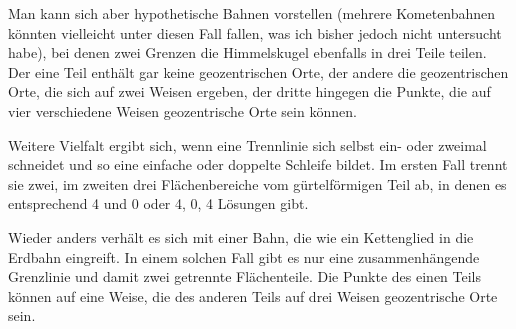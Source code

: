 Man kann sich aber hypothetische Bahnen vorstellen\HistoricalNoteDouble{Siehe Notiz 18.]} (mehrere Kometenbahnen könnten vielleicht unter diesen Fall fallen, was ich bisher jedoch nicht untersucht habe), bei denen zwei Grenzen die Himmelskugel ebenfalls in drei Teile teilen. Der eine Teil enthält gar keine geozentrischen Orte, der andere die geozentrischen Orte, die sich auf zwei Weisen ergeben, der dritte hingegen die Punkte, die auf vier verschiedene Weisen geozentrische Orte sein können.

Weitere Vielfalt ergibt sich, wenn eine Trennlinie sich selbst ein- oder zweimal schneidet und so eine einfache oder doppelte Schleife bildet. Im ersten Fall trennt sie zwei, im zweiten drei Flächenbereiche vom gürtelförmigen Teil ab, in denen es entsprechend 4 und 0 oder 4, 0, 4 Lösungen gibt.

Wieder anders verhält es sich mit einer Bahn, die wie ein Kettenglied in die Erdbahn eingreift. In einem solchen Fall gibt es nur eine zusammenhängende Grenzlinie und damit zwei getrennte Flächenteile. Die Punkte des einen Teils können auf eine Weise, die des anderen Teils auf drei Weisen geozentrische Orte sein.


